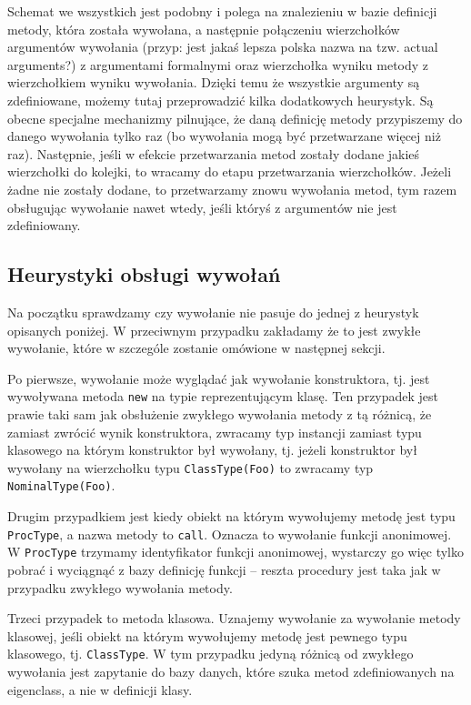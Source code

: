 \documentclass[declaration,shortabstract]{iithesis}
\begin{document}
Schemat we wszystkich jest podobny i polega na znalezieniu w bazie definicji metody, która została wywołana, a następnie połączeniu wierzchołków argumentów wywołania (przyp: jest jakaś lepsza polska nazwa na tzw. actual arguments?) z argumentami formalnymi oraz wierzchołka wyniku metody z wierzchołkiem wyniku wywołania.
Dzięki temu że wszystkie argumenty są zdefiniowane, możemy tutaj przeprowadzić kilka dodatkowych heurystyk.
Są obecne specjalne mechanizmy pilnujące, że daną definicję metody przypiszemy do danego wywołania tylko raz (bo wywołania mogą być przetwarzane więcej niż raz).
Następnie, jeśli w efekcie przetwarzania metod zostały dodane jakieś wierzchołki do kolejki, to wracamy do etapu przetwarzania wierzchołków.
Jeżeli żadne nie zostały dodane, to przetwarzamy znowu wywołania metod, tym razem obsługując wywołanie nawet wtedy, jeśli któryś z argumentów nie jest zdefiniowany.

\subsection{Heurystyki obsługi wywołań}

Na początku sprawdzamy czy wywołanie nie pasuje do jednej z heurystyk opisanych poniżej. W przeciwnym przypadku zakładamy że to jest zwykłe wywołanie, które w szczególe zostanie omówione w następnej sekcji.

Po pierwsze, wywołanie może wyglądać jak wywołanie konstruktora, tj. jest wywoływana metoda \texttt{new} na typie reprezentującym klasę. Ten przypadek jest prawie taki sam jak obsłużenie zwykłego wywołania metody z tą różnicą, że zamiast zwrócić wynik konstruktora, zwracamy typ instancji zamiast typu klasowego na którym konstruktor był wywołany, tj. jeżeli konstruktor był wywołany na wierzchołku typu \texttt{ClassType(Foo)} to zwracamy typ \texttt{NominalType(Foo)}.

Drugim przypadkiem jest kiedy obiekt na którym wywołujemy metodę jest typu \texttt{ProcType}, a nazwa metody to \texttt{call}. Oznacza to wywołanie funkcji anonimowej. W \texttt{ProcType} trzymamy identyfikator funkcji anonimowej, wystarczy go więc tylko pobrać i wyciągnąć z bazy definicję funkcji -- reszta procedury jest taka jak w przypadku zwykłego wywołania metody.

Trzeci przypadek to metoda klasowa. Uznajemy wywołanie za wywołanie metody klasowej, jeśli obiekt na którym wywołujemy metodę jest pewnego typu klasowego, tj. \texttt{ClassType}. W tym przypadku jedyną różnicą od zwykłego wywołania jest zapytanie do bazy danych, które szuka metod zdefiniowanych na eigenclass, a nie w definicji klasy.
\end{document}
